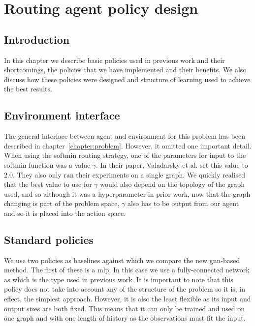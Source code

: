 \chapter{Routing agent policy design}
\label{chapter:learning}

 \section{Introduction}
In this chapter we describe basic policies used in previous work and their shortcomings, the policies that we have implemented and their benefits. We also discuss how these policies were designed and structure of learning used to achieve the best results.

\section{Environment interface}
The general interface between agent and environment for this problem has been described in chapter~\ref{chapter:problem}. However, it omitted one important detail. When using the softmin routing strategy, one of the parameters for input to the softmin function was a value $\gamma$. In their paper, Valadarsky et al.\cite{valadarsky2017learning} set this value to $2.0$. They also only ran their experiments on a single graph. We quickly realised that the best value to use for $\gamma$ would also depend on the topology of the graph used, and so although it was a hyperparameter in prior work, now that the graph changing is part of the problem space, $\gamma$ also has to be output from our agent and so it is placed into the action space.

\section{Standard policies}
We use two policies as baselines against which we compare the new \ac{gnn}-based method. The first of these is a \acf{mlp}\cite{rumelhart1986learning}. In this case we use a fully-connected network as which is the type used in previous work. It is important to note that this policy does not take into account any of the structure of the problem so it is, in effect, the simplest approach. However, it is also the least flexible as its input and output sizes are both fixed. This means that it can only be trained and used on one graph and with one length of history as the observations must fit the input.


